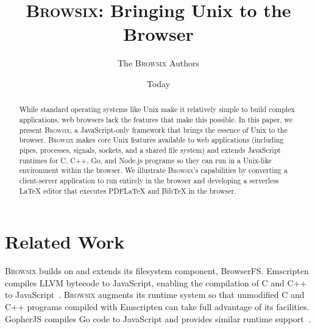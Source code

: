 \documentclass[11pt]{article}
\newcommand{\Browsix}{\textsc{Browsix}}
\begin{document}
\title{\bf \Browsix{}: Bringing Unix to the Browser}
\author{The \Browsix{} Authors}
\date{Today}
\maketitle

\begin{abstract}

While standard operating systems like Unix make it relatively simple
to build complex applications, web browsers lack the features that
make this possible. In this paper, we present \Browsix{}, a
JavaScript-only framework that brings the essence of Unix to the
browser. \Browsix{} makes core Unix features available to web
applications (including pipes, processes, signals, sockets, and a
shared file system) and extends JavaScript runtimes for C, C++, Go,
and Node.js programs so they can run in a Unix-like environment within
the browser. We illustrate \Browsix{}'s capabilities by converting a
client-server application to run entirely in the browser and
developing a serverless \LaTeX{} editor that executes PDFLaTeX and
BibTeX in the browser.

\end{abstract}

\section{Related Work}
\label{sec:related}

\Browsix{} builds on and extends its filesystem component,
BrowserFS. Emscripten compiles LLVM bytecode to JavaScript, enabling
the compilation of C and C++ to JavaScript~\cite{emscripten}.
\Browsix{} augments its runtime system so that unmodified C and C++
programs compiled with Emscripten can take full advantage of its
facilities. GopherJS compiles Go code to JavaScript and provides
similar runtime support~\cite{musiol:2016gopherjs}.

{}

\end{document}
